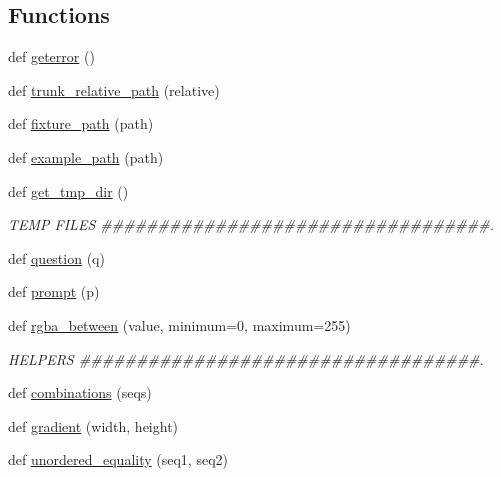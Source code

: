 \subsection*{Functions}
\begin{DoxyCompactItemize}
\item 
def \hyperlink{namespacepygame_1_1tests_1_1test__utils_a5f6446aff1b4a74a9c37d4a770796ccc}{geterror} ()
\item 
def \hyperlink{namespacepygame_1_1tests_1_1test__utils_a8f20ef160f3a0da3f057545a307ee4ec}{trunk\+\_\+relative\+\_\+path} (relative)
\item 
def \hyperlink{namespacepygame_1_1tests_1_1test__utils_a9e7895a1969e30e5106b7e510a3b9102}{fixture\+\_\+path} (path)
\item 
def \hyperlink{namespacepygame_1_1tests_1_1test__utils_ae4fbd89756721622a7960db9fcb1229b}{example\+\_\+path} (path)
\item 
def \hyperlink{namespacepygame_1_1tests_1_1test__utils_af1caf480792d0aee5de2f16c479ffdd9}{get\+\_\+tmp\+\_\+dir} ()
\begin{DoxyCompactList}\small\item\em T\+E\+MP F\+I\+L\+ES \#\#\#\#\#\#\#\#\#\#\#\#\#\#\#\#\#\#\#\#\#\#\#\#\#\#\#\#\#\#\#\#\#\#. \end{DoxyCompactList}\item 
def \hyperlink{namespacepygame_1_1tests_1_1test__utils_aaae8ba9431aab8a449af67c46fb56fe5}{question} (q)
\item 
def \hyperlink{namespacepygame_1_1tests_1_1test__utils_ad1df3f1ab46016da74332e7059e8ec9d}{prompt} (p)
\item 
def \hyperlink{namespacepygame_1_1tests_1_1test__utils_addfe65a243af08a27726e75773883a1e}{rgba\+\_\+between} (value, minimum=0, maximum=255)
\begin{DoxyCompactList}\small\item\em H\+E\+L\+P\+E\+RS \#\#\#\#\#\#\#\#\#\#\#\#\#\#\#\#\#\#\#\#\#\#\#\#\#\#\#\#\#\#\#\#\#\#\#. \end{DoxyCompactList}\item 
def \hyperlink{namespacepygame_1_1tests_1_1test__utils_a218aae1725446489b354fb128ae25e68}{combinations} (seqs)
\item 
def \hyperlink{namespacepygame_1_1tests_1_1test__utils_aaa9188a657cf837a1cfef7c381b1ef50}{gradient} (width, height)
\item 
def \hyperlink{namespacepygame_1_1tests_1_1test__utils_a45a287290e77fadc7ca99e08519b88e0}{unordered\+\_\+equality} (seq1, seq2)
\item 

\end{DoxyCompactItemize}
